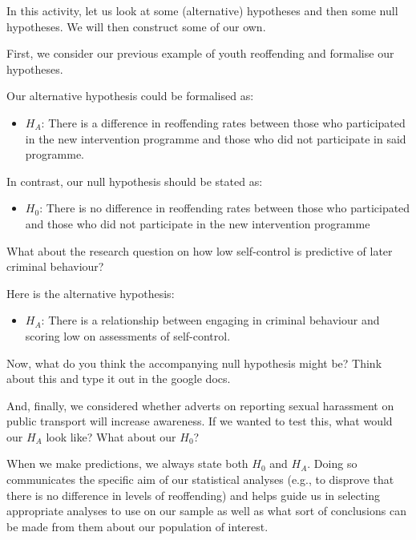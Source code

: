\documentclass[
]{book}
\providecommand{\tightlist}{%
  \setlength{\itemsep}{0pt}\setlength{\parskip}{0pt}}
\begin{document}
In this activity, let us look at some (alternative) hypotheses and then some null hypotheses. We will then construct some of our own.

First, we consider our previous example of youth reoffending and formalise our hypotheses.

Our alternative hypothesis could be formalised as:

\begin{itemize}
\tightlist
\item
  \(H_A\): There is a difference in reoffending rates between those who participated in the new intervention programme and those who did not participate in said programme.
\end{itemize}

In contrast, our null hypothesis should be stated as:

\begin{itemize}
\tightlist
\item
  \(H_0\): There is no difference in reoffending rates between those who participated and those who did not participate in the new intervention programme
\end{itemize}

What about the research question on how low self-control is predictive of later criminal behaviour?

Here is the alternative hypothesis:

\begin{itemize}
\tightlist
\item
  \(H_A\): There is a relationship between engaging in criminal behaviour and scoring low on assessments of self-control.
\end{itemize}

Now, what do you think the accompanying null hypothesis might be? Think about this and type it out in the google docs.

And, finally, we considered whether adverts on reporting sexual harassment on public transport will increase awareness. If we wanted to test this, what would our \(H_A\) look like? What about our \(H_0\)?

When we make predictions, we always state both \(H_0\) and \(H_A\). Doing so communicates the specific aim of our statistical analyses (e.g., to disprove that there is no difference in levels of reoffending) and helps guide us in selecting appropriate analyses to use on our sample as well as what sort of conclusions can be made from them about our population of interest.
\end{document}
